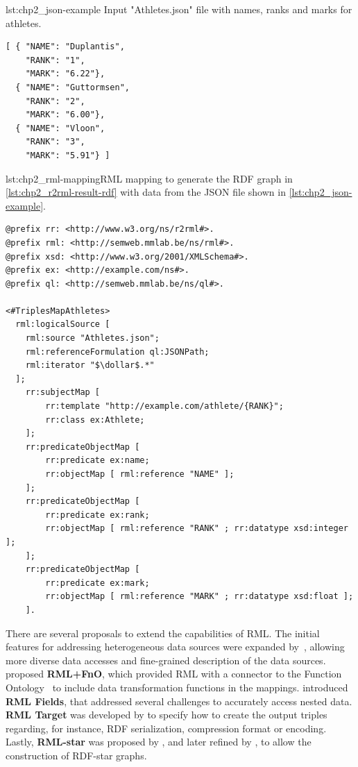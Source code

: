 \begin{minipage}{\textwidth}
\begin{captionedlisting}{lst:chp2_json-example}
{Input "Athletes.json" file with names, ranks and marks for athletes.}
\centering
\begin{lstlisting}[]
[ { "NAME": "Duplantis",
    "RANK": "1",
    "MARK": "6.22"},
  { "NAME": "Guttormsen",
    "RANK": "2",  
    "MARK": "6.00"},
  { "NAME": "Vloon",
    "RANK": "3",
    "MARK": "5.91"} ]
\end{lstlisting}
\end{captionedlisting}
\end{minipage}


\begin{captionedlisting}{lst:chp2_rml-mapping}{RML mapping to generate the RDF graph in \cref{lst:chp2_r2rml-result-rdf} with data from the JSON file shown in \cref{lst:chp2_json-example}.}
\centering
{\begin{lstlisting}[language=r2rml]
@prefix rr: <http://www.w3.org/ns/r2rml#>.
@prefix rml: <http://semweb.mmlab.be/ns/rml#>.
@prefix xsd: <http://www.w3.org/2001/XMLSchema#>.
@prefix ex: <http://example.com/ns#>.
@prefix ql: <http://semweb.mmlab.be/ns/ql#>.

<#TriplesMapAthletes>
  rml:logicalSource [
    rml:source "Athletes.json";
    rml:referenceFormulation ql:JSONPath;
    rml:iterator "$\dollar$.*"
  ];
    rr:subjectMap [
        rr:template "http://example.com/athlete/{RANK}";
        rr:class ex:Athlete;
    ];
    rr:predicateObjectMap [
        rr:predicate ex:name;
        rr:objectMap [ rml:reference "NAME" ];
    ];
    rr:predicateObjectMap [
        rr:predicate ex:rank;
        rr:objectMap [ rml:reference "RANK" ; rr:datatype xsd:integer ];
    ];
    rr:predicateObjectMap [
        rr:predicate ex:mark;
        rr:objectMap [ rml:reference "MARK" ; rr:datatype xsd:float ];
    ].
\end{lstlisting}}
\end{captionedlisting}

There are several proposals to extend the capabilities of RML. The initial features for addressing heterogeneous data sources were expanded by~\cite{Dimou2015Machine}, allowing more diverse data accesses and fine-grained description of the data sources. \cite{DeMeester2017fno_dbpedia} proposed \textbf{RML+FnO}, which provided RML with a connector to the Function Ontology~\parencite{demeester2016fno} to include data transformation functions in the mappings. \cite{delva2021rml-fields} introduced  \textbf{RML Fields}, that addressed several challenges to accurately access nested data. \textbf{RML Target} was developed by \cite{VanAssche2021LeveragingWebThings} to specify how to create the output triples regarding, for instance, RDF serialization, compression format or encoding. Lastly, \textbf{RML-star} was proposed by \cite{delva2021rml-star}, and later refined by \cite{arenas2023morphstar}, to allow the construction of RDF-star graphs. 

